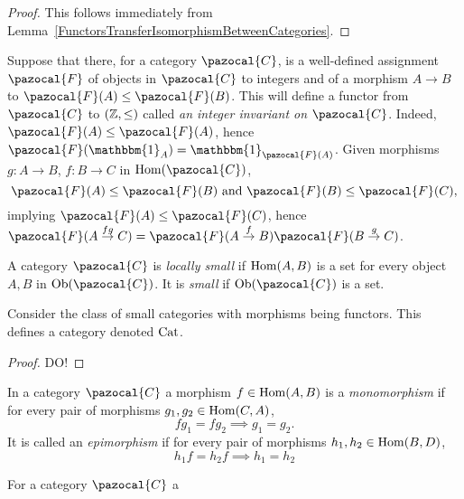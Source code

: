 \begin{proof}
    This follows immediately from Lemma~\ref{FunctorsTransferIsomorphismBetweenCategories}.
\end{proof}
\begin{example}\label{IntegerInvariants}
    Suppose that there, for a category $\pazocal{C}$, is a well-defined assignment $\pazocal{F}$ of objects in $\pazocal{C}$ to integers and of a morphism $A\rightarrow B$ to $\pazocal{F}(A)\leq \pazocal{F}(B)$. This will define a functor from $\pazocal{C}$ to $(\mathbb{Z},\leq)$ called \textit{an integer invariant on $\pazocal{C}$}. Indeed, $\pazocal{F}(A) \leq \pazocal{F}(A)$, hence $\pazocal{F}(\mathbbm{1}_A)=\mathbbm{1}_{\pazocal{F}(A)}$. Given morphisms $g:A\rightarrow B$, $f:B\rightarrow C$ in $\Hom(\pazocal{C})$, 
    $$\pazocal{F}(A)\leq\pazocal{F}(B) \text{ and } \pazocal{F}(B)\leq \pazocal{F}(C),$$
    implying $\pazocal{F}(A)\leq \pazocal{F}(C)$, hence $\pazocal{F}(A\overset{fg}{\rightarrow} C) = \pazocal{F}(A\overset{f}{\rightarrow}B)\pazocal{F}(B\overset{g}{\rightarrow}C)$.
    
\end{example}
\begin{definition}
    A category $\pazocal{C}$ is \textit{locally small} if $\mathrm{Hom}(A,B)$ is a set for every object $A,B$ in $\Ob(\pazocal{C})$. It is \textit{small} if $\Ob(\pazocal{C})$ is a set.
\end{definition}
\begin{proposition}
    Consider the class of small categories with morphisms being functors. This defines a category denoted $\mathrm{Cat}$. 
\end{proposition}
\begin{proof}
    {\LARGE DO!}
\end{proof}
\begin{definition}
    In a category $\pazocal{C}$ a morphism $f\in \mathrm{Hom}(A,B)$ is a \textit{monomorphism} if for every pair of morphisms $g_1,g_2 \in \mathrm{Hom}(C,A)$, 
    $$fg_1=fg_2\implies g_1 = g_2.$$
    It is called an \textit{epimorphism} if for every pair of morphisms $h_1,h_2\in \mathrm{Hom}(B,D)$,
    $$h_1f=h_2f\implies h_1=h_2$$    
\end{definition}

\begin{lemma}
    For a category $\pazocal{C}$ a 
\end{lemma}
